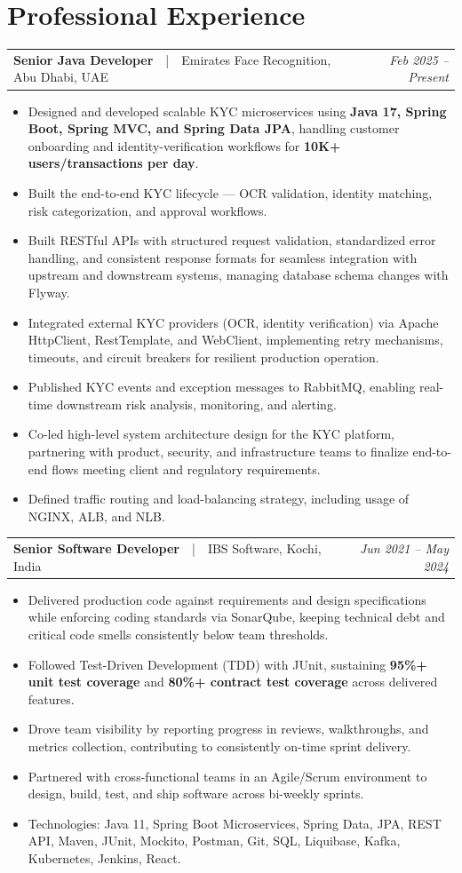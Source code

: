 \documentclass[a4paper,10pt]{article}
\makeatletter
\newcommand{\job}[3]{%
  \vspace{4pt}%
  \begin{tabularx}{\linewidth}{@{}X r@{}}
    \textbf{#1}\ \ {\color{subtle}|}\ \ {\color{subtle}#2} & {\small\itshape\color{subtle}#3}
  \end{tabularx}\par
}
\makeatother
\begin{document}
\section{Professional Experience}

\job{Senior Java Developer}{Emirates Face Recognition, Abu Dhabi, UAE}{Feb 2025 -- Present}
\begin{itemize}
  \item Designed and developed scalable KYC microservices using \textbf{Java 17, Spring Boot, Spring MVC, and Spring Data JPA}, handling customer onboarding and identity-verification workflows for \textbf{10K+ users/transactions per day}.
  \item Built the end-to-end KYC lifecycle --- OCR validation, identity matching, risk categorization, and approval workflows.
  \item Built RESTful APIs with structured request validation, standardized error handling, and consistent response formats for seamless integration with upstream and downstream systems, managing database schema changes with Flyway.
  \item Integrated external KYC providers (OCR, identity verification) via Apache HttpClient, RestTemplate, and WebClient, implementing retry mechanisms, timeouts, and circuit breakers for resilient production operation.
  \item Published KYC events and exception messages to RabbitMQ, enabling real-time downstream risk analysis, monitoring, and alerting.
  \item Co-led high-level system architecture design for the KYC platform, partnering with product, security, and infrastructure teams to finalize end-to-end flows meeting client and regulatory requirements.
  \item Defined traffic routing and load-balancing strategy, including usage of NGINX, ALB, and NLB.
\end{itemize}

\job{Senior Software Developer}{IBS Software, Kochi, India}{Jun 2021 -- May 2024}
\begin{itemize}
  \item Delivered production code against requirements and design specifications while enforcing coding standards via SonarQube, keeping technical debt and critical code smells consistently below team thresholds.
  \item Followed Test-Driven Development (TDD) with JUnit, sustaining \textbf{95\%+ unit test coverage} and \textbf{80\%+ contract test coverage} across delivered features.
  \item Drove team visibility by reporting progress in reviews, walkthroughs, and metrics collection, contributing to consistently on-time sprint delivery.
  \item Partnered with cross-functional teams in an Agile/Scrum environment to design, build, test, and ship software across bi-weekly sprints.
  \item Technologies: Java 11, Spring Boot Microservices, Spring Data, JPA, REST API, Maven, JUnit, Mockito, Postman, Git, SQL, Liquibase, Kafka, Kubernetes, Jenkins, React.
\end{itemize}
\end{document}
